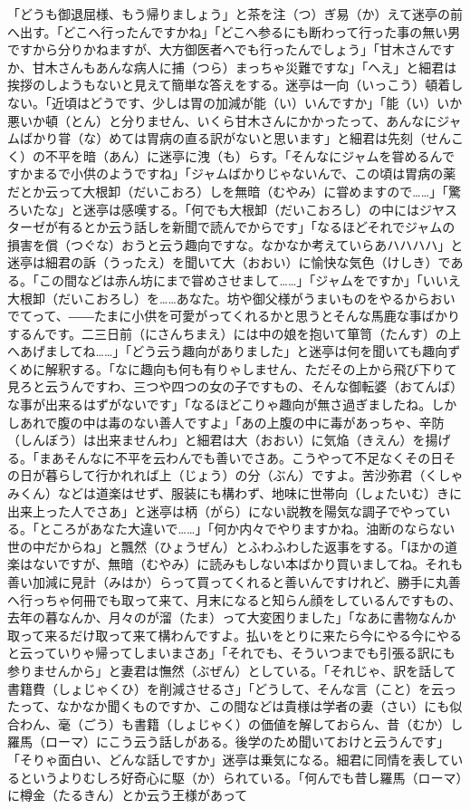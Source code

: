 \documentclass{book}
\begin{document}
「どうも御退屈様、もう帰りましょう」と茶を注（つ）ぎ易（か）えて迷亭の前へ出す。「どこへ行ったんですかね」「どこへ参るにも断わって行った事の無い男ですから分りかねますが、大方御医者へでも行ったんでしょう」「甘木さんですか、甘木さんもあんな病人に捕（つら）まっちゃ災難ですな」「へえ」と細君は挨拶のしようもないと見えて簡単な答えをする。迷亭は一向（いっこう）頓着しない。「近頃はどうです、少しは胃の加減が能（い）いんですか」「能（い）いか悪いか頓（とん）と分りません、いくら甘木さんにかかったって、あんなにジャムばかり甞（な）めては胃病の直る訳がないと思います」と細君は先刻（せんこく）の不平を暗（あん）に迷亭に洩（も）らす。「そんなにジャムを甞めるんですかまるで小供のようですね」「ジャムばかりじゃないんで、この頃は胃病の薬だとか云って大根卸（だいこおろ）しを無暗（むやみ）に甞めますので\ldots{}\ldots{}」「驚ろいたな」と迷亭は感嘆する。「何でも大根卸（だいこおろし）の中にはジヤスターゼが有るとか云う話しを新聞で読んでからです」「なるほどそれでジャムの損害を償（つぐな）おうと云う趣向ですな。なかなか考えていらあハハハハ」と迷亭は細君の訴（うったえ）を聞いて大（おおい）に愉快な気色（けしき）である。「この間などは赤ん坊にまで甞めさせまして\ldots{}\ldots{}」「ジャムをですか」「いいえ大根卸（だいこおろし）を\ldots{}\ldots{}あなた。坊や御父様がうまいものをやるからおいでてって、――たまに小供を可愛がってくれるかと思うとそんな馬鹿な事ばかりするんです。二三日前（にさんちまえ）には中の娘を抱いて箪笥（たんす）の上へあげましてね\ldots{}\ldots{}」「どう云う趣向がありました」と迷亭は何を聞いても趣向ずくめに解釈する。「なに趣向も何も有りゃしません、ただその上から飛び下りて見ろと云うんですわ、三つや四つの女の子ですもの、そんな御転婆（おてんば）な事が出来るはずがないです」「なるほどこりゃ趣向が無さ過ぎましたね。しかしあれで腹の中は毒のない善人ですよ」「あの上腹の中に毒があっちゃ、辛防（しんぼう）は出来ませんわ」と細君は大（おおい）に気焔（きえん）を揚げる。「まあそんなに不平を云わんでも善いでさあ。こうやって不足なくその日その日が暮らして行かれれば上（じょう）の分（ぶん）ですよ。苦沙弥君（くしゃみくん）などは道楽はせず、服装にも構わず、地味に世帯向（しょたいむ）きに出来上った人でさあ」と迷亭は柄（がら）にない説教を陽気な調子でやっている。「ところがあなた大違いで\ldots{}\ldots{}」「何か内々でやりますかね。油断のならない世の中だからね」と飄然（ひょうぜん）とふわふわした返事をする。「ほかの道楽はないですが、無暗（むやみ）に読みもしない本ばかり買いましてね。それも善い加減に見計（みはか）らって買ってくれると善いんですけれど、勝手に丸善へ行っちゃ何冊でも取って来て、月末になると知らん顔をしているんですもの、去年の暮なんか、月々のが溜（たま）って大変困りました」「なあに書物なんか取って来るだけ取って来て構わんですよ。払いをとりに来たら今にやる今にやると云っていりゃ帰ってしまいまさあ」「それでも、そういつまでも引張る訳にも参りませんから」と妻君は憮然（ぶぜん）としている。「それじゃ、訳を話して書籍費（しょじゃくひ）を削減させるさ」「どうして、そんな言（こと）を云ったって、なかなか聞くものですか、この間などは貴様は学者の妻（さい）にも似合わん、毫（ごう）も書籍（しょじゃく）の価値を解しておらん、昔（むか）し羅馬（ローマ）にこう云う話しがある。後学のため聞いておけと云うんです」「そりゃ面白い、どんな話しですか」迷亭は乗気になる。細君に同情を表しているというよりむしろ好奇心に駆（か）られている。「何んでも昔し羅馬（ローマ）に樽金（たるきん）とか云う王様があって\ldo
\end{document}
